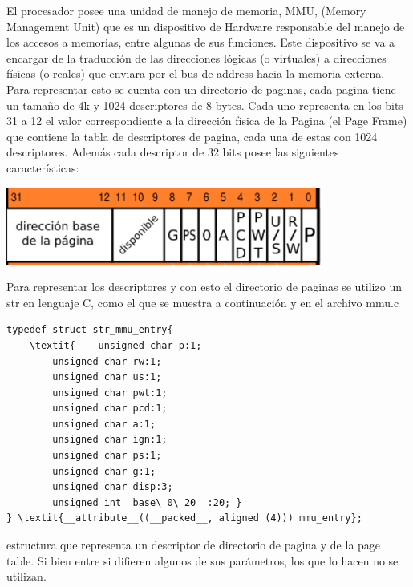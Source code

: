 El procesador posee una unidad de manejo de memoria, MMU, (Memory Management Unit) que es un dispositivo de Hardware responsable del manejo de los accesos a memorias, entre 
algunas de sus funciones. Este dispositivo se va a encargar  de la traducci\'on de las direcciones l\'ogicas (o virtuales) a direcciones f\'isicas (o reales) que enviara por el 
bus de address hacia la memoria externa. Para representar esto se cuenta  con un directorio de paginas, cada pagina tiene un tamaño de 4k y 1024 descriptores de 8 bytes. Cada uno 
representa en los bits 31 a 12  el valor correspondiente a la direcci\'on f\'isica de la Pagina (el Page Frame) que contiene la tabla de descriptores de pagina, cada una de estas 
con 1024 descriptores. Adem\'as  cada descriptor de 32 bits posee las siguientes caracter\'isticas:\newline

\includegraphics[width=\textwidth,height=1.0in,keepaspectratio
]{imagen.jpg}\newline

Para representar los descriptores y con esto el directorio de paginas se utilizo un str en lenguaje C, como el que se muestra a continuaci\'on y en el archivo mmu.c		\newline
\begin{codesnippet}
\begin{verbatim}
typedef struct str_mmu_entry{ 
	\textit{	unsigned char p:1;
		unsigned char rw:1; 
		unsigned char us:1; 
		unsigned char pwt:1;
		unsigned char pcd:1; 
		unsigned char a:1; 
		unsigned char ign:1;
		unsigned char ps:1; 
		unsigned char g:1;
		unsigned char disp:3; 
		unsigned int  base\_0\_20  :20; }
} \textit{__attribute__((__packed__, aligned (4))) mmu_entry};
\end{verbatim}
\end{codesnippet}
estructura que representa un descriptor de directorio de pagina y de la page table. Si bien entre si difieren algunos de sus par\'ametros, los que lo hacen no se utilizan.\newline \newline


